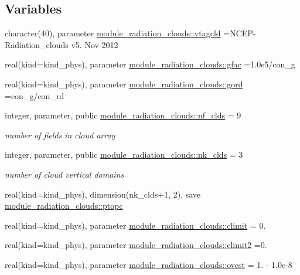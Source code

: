 \subsection*{Variables}
\begin{DoxyCompactItemize}
\item 
character(40), parameter \hyperlink{namespacemodule__radiation__clouds_a54f11c2f6353f244501cf4ec3553d78b}{module\+\_\+radiation\+\_\+clouds\+::vtagcld} =\textquotesingle{}N\+C\+EP-\/Radiation\+\_\+clouds v5. Nov 2012 \textquotesingle{}
\item 
real(kind=kind\+\_\+phys), parameter \hyperlink{group__module__radiation__clouds_gab4060544be25be2b0a87042fb3bd6242}{module\+\_\+radiation\+\_\+clouds\+::gfac} =1.\+0e5/con\+\_\+g
\item 
real(kind=kind\+\_\+phys), parameter \hyperlink{group__module__radiation__clouds_ga50ea21222eb91e6363e8bf1338b34a66}{module\+\_\+radiation\+\_\+clouds\+::gord} =con\+\_\+g/con\+\_\+rd
\item 
integer, parameter, public \hyperlink{group__module__radiation__clouds_ga66cf0f94619a3d865b0c593197a30576}{module\+\_\+radiation\+\_\+clouds\+::nf\+\_\+clds} = 9
\begin{DoxyCompactList}\small\item\em number of fields in cloud array \end{DoxyCompactList}\item 
integer, parameter, public \hyperlink{group__module__radiation__clouds_ga2739168b8205ee860eb8a160ea722a44}{module\+\_\+radiation\+\_\+clouds\+::nk\+\_\+clds} = 3
\begin{DoxyCompactList}\small\item\em number of cloud vertical domains \end{DoxyCompactList}\item 
real(kind=kind\+\_\+phys), dimension(nk\+\_\+clds+1, 2), save \hyperlink{group__module__radiation__clouds_ga03bc5d19cbdc84a2032c8d591ba4c96a}{module\+\_\+radiation\+\_\+clouds\+::ptopc}
\item 
real(kind=kind\+\_\+phys), parameter \hyperlink{group__module__radiation__clouds_gad4d5840310847f5bf39082114069ceb8}{module\+\_\+radiation\+\_\+clouds\+::climit} = 0.
\item 
real(kind=kind\+\_\+phys), parameter \hyperlink{group__module__radiation__clouds_ga2f6f333d39f496f623036802fc05f209}{module\+\_\+radiation\+\_\+clouds\+::climit2} =0.
\item 
real(kind=kind\+\_\+phys), parameter \hyperlink{group__module__radiation__clouds_ga5667082e13ef37593bdfcc152e3dd449}{module\+\_\+radiation\+\_\+clouds\+::ovcst} = 1. -\/ 1.\+0e-\/8

\end{DoxyCompactItemize}
